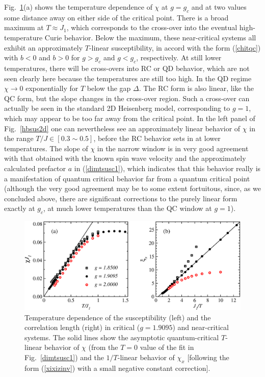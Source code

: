 \documentclass[draft,numberedheadings]{aipproc}
\begin{document}
Fig.~\ref{dimxk}(a) shows the temperature dependence of $\chi$ at $g=g_c$ and at two values some distance away on either side of the critical point. There
is a broad maximum at $T \approx J_1$, which corresponds to the cross-over into the eventual high-temperature Curie behavior. Below the maximum, these 
near-critical systems all exhibit an approximately $T$-linear susceptibility, in accord with the form (\ref{chitqc}) with $b<0$ and $b>0$ for $g>g_c$ 
and $g <g_c$, respectively. At still lower temperatures, there will be cross-overs into RC or QD behavior, which are not seen clearly here because the 
temperatures are still too high. In the QD regime $\chi \to 0$ exponentially for $T$ below the gap $\Delta$. The RC form is also linear, like the QC form, 
but the slope changes in the cross-over region. Such a cross-over can actually be seen in the standard 2D Heisenberg model, corresponding to $g=1$, which 
may appear to be too far away from the critical point. In the left panel of Fig.~\ref{hbsus2d} one can nevertheless see an approximately linear behavior of 
$\chi$ in the range $T/J \in [0.3 \sim 0.5]$, before the RC behavior sets in at lower temperatures. The slope of $\chi$ in the narrow window is 
in very good agreement with that obtained with the known spin wave velocity and the approximately calculated prefactor $a$ in (\ref{dimtsusc1}), which indicates 
that this behavior really is a manifestation of quantum critical behavior far from a quantum critical point \cite{chubukov,kim98} (although the very good 
agreement may be to some extent fortuitous, since, as we concluded above, there are significant corrections to the purely linear form exactly at $g_c$, 
at much lower temperatures than the QC window at $g=1$).  

\begin{figure}
\includegraphics[width=13.5cm, clip]{dimxk.eps}
\caption{Temperature dependence of the susceptibility (left) and the correlation length (right) in critical ($g=1.9095$) and near-critical systems. 
The solid lines show the asymptotic quantum-critical $T$-linear behavior of $\chi$ (from the $T=0$ value of the fit in Fig.~\ref{dimtsusc1}) and 
the $1/T$-linear behavior of $\chi_x$ [following the form (\ref{xixizinv}) with a small negative constant correction].}
\label{dimxk}
\end{figure}
\end{document}
